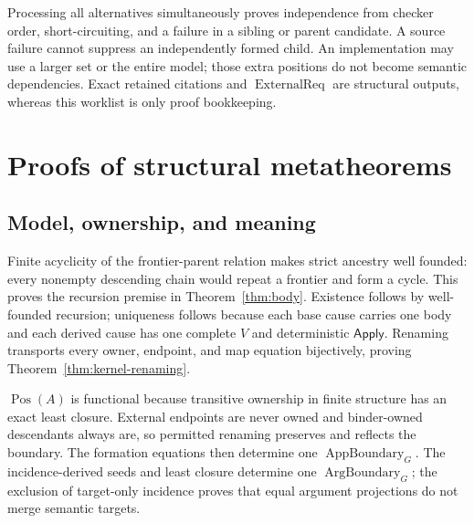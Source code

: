 \documentclass[11pt,twoside]{article}
\newcommand{\Apply}{\mathsf{Apply}}
\begin{document}
Processing all alternatives simultaneously proves independence from checker order,
short-circuiting, and a failure in a sibling or parent candidate.  A source failure
cannot suppress an independently formed child.  An implementation may use a larger
set or the entire model; those extra positions do not become semantic dependencies.
Exact retained citations and \(\operatorname{ExternalReq}\) are structural outputs,
whereas this worklist is only proof bookkeeping.

\section{Proofs of structural metatheorems}\label{app:proofs}

\subsection{Model, ownership, and meaning}

Finite acyclicity of the frontier-parent relation makes strict ancestry well
founded: every nonempty descending chain would repeat a frontier and form a cycle.
This proves the recursion premise in Theorem~\ref{thm:body}.  Existence follows by
well-founded recursion; uniqueness follows because each base cause carries one body
and each derived cause has one complete \(V\) and deterministic \(\Apply\).
Renaming transports every owner, endpoint, and map equation bijectively, proving
Theorem~\ref{thm:kernel-renaming}.

\(\operatorname{Pos}(A)\) is functional because transitive ownership in finite
structure has an exact least closure.  External endpoints are never owned and
binder-owned descendants always are, so permitted renaming preserves and reflects
the boundary.  The formation equations then determine one
\(\operatorname{AppBoundary}_G\).  The incidence-derived seeds and least closure
determine one \(\operatorname{ArgBoundary}_G\); the exclusion of target-only
incidence proves that equal argument projections do not merge semantic targets.
\end{document}

